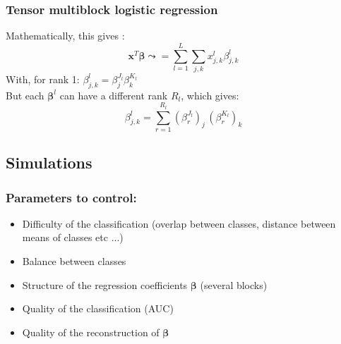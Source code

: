 \documentclass{beamer}
\begin{document}
\begin{frame}
    \frametitle{Tensor multiblock logistic regression}
    Mathematically, this gives :
    $$\mathbf{x}^T\bm{\beta} \leadsto =  \sum\limits_{l = 1}^L \sum\limits_{j,k} x_{j,k}^l\beta_{j,k}^l$$
    With, for rank 1: $\beta_{j,k}^l = \beta_j^{J_l}\beta_k^{K_l}$\\[10 pt]
    But each $\bm{\beta}^l$ can have a different rank $R_l$, which gives:
    $$\beta_{j,k}^l = \sum\limits_{r = 1}^{R_l} (\beta_r^{J_l})_j \, (\beta_r^{K_l})_k $$
\end{frame}

\begin{frame}
    \section{Simulations}    
\end{frame}

\begin{frame}
    \frametitle{Parameters to control:}
    \begin{itemize}
        \item Difficulty of the classification (overlap between classes, distance between means of classes etc ...)\\[12 pt]
        \item Balance between classes\\[12 pt]
        \item Structure of the regression coefficients $\bm{\beta}$ (several blocks)\\[12 pt] 
        \item Quality of the classification (AUC)\\[12 pt]
        \item Quality of the reconstruction of $\bm{\beta}$ \nocite{picto}
    \end{itemize}
\end{frame}
\end{document}
